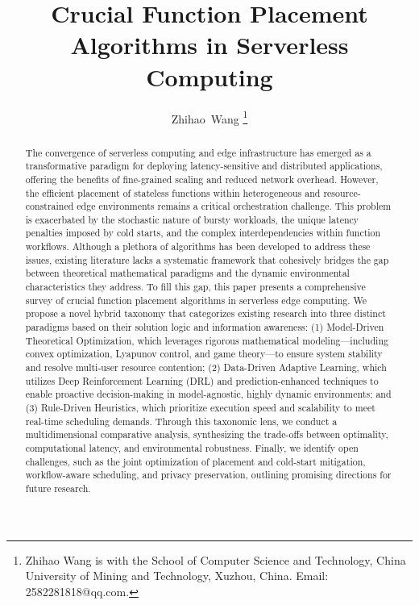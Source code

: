 \documentclass[lettersize,journal]{IEEEtran}
\begin{document}
\title{Crucial Function Placement Algorithms in Serverless Computing}

\author{Zhihao~Wang%
\thanks{Zhihao Wang is with the School of Computer Science and Technology, 
China University of Mining and Technology, Xuzhou, China. 
Email: 2582281818@qq.com.}
}





\maketitle


\begin{abstract}
The convergence of serverless computing and edge infrastructure has emerged as a transformative paradigm for deploying latency-sensitive and distributed applications, offering the benefits of fine-grained scaling and reduced network overhead. However, the efficient placement of stateless functions within heterogeneous and resource-constrained edge environments remains a critical orchestration challenge. This problem is exacerbated by the stochastic nature of bursty workloads, the unique latency penalties imposed by cold starts, and the complex interdependencies within function workflows. Although a plethora of algorithms has been developed to address these issues, existing literature lacks a systematic framework that cohesively bridges the gap between theoretical mathematical paradigms and the dynamic environmental characteristics they address.
To fill this gap, this paper presents a comprehensive survey of crucial function placement algorithms in serverless edge computing. We propose a novel hybrid taxonomy that categorizes existing research into three distinct paradigms based on their solution logic and information awareness: (1) Model-Driven Theoretical Optimization, which leverages rigorous mathematical modeling—including convex optimization, Lyapunov control, and game theory—to ensure system stability and resolve multi-user resource contention; (2) Data-Driven Adaptive Learning, which utilizes Deep Reinforcement Learning (DRL) and prediction-enhanced techniques to enable proactive decision-making in model-agnostic, highly dynamic environments; and (3) Rule-Driven Heuristics, which prioritize execution speed and scalability to meet real-time scheduling demands. Through this taxonomic lens, we conduct a multidimensional comparative analysis, synthesizing the trade-offs between optimality, computational latency, and environmental robustness. Finally, we identify open challenges, such as the joint optimization of placement and cold-start mitigation, workflow-aware scheduling, and privacy preservation, outlining promising directions for future research.
\end{abstract}
\end{document}
